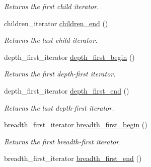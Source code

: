 \begin{DoxyCompactItemize}
\begin{DoxyCompactList}\small\item\em Returns the first child iterator. \end{DoxyCompactList}\item 
\hypertarget{class_d_o_1_1_tree_a4bbe761f0929f34567f339615d616bda}{children\-\_\-iterator \hyperlink{class_d_o_1_1_tree_a4bbe761f0929f34567f339615d616bda}{children\-\_\-end} ()}\label{class_d_o_1_1_tree_a4bbe761f0929f34567f339615d616bda}

\begin{DoxyCompactList}\small\item\em Returns the last child iterator. \end{DoxyCompactList}\item 
\hypertarget{class_d_o_1_1_tree_aacea50afcacf312bf2254b5c6aa515d4}{depth\-\_\-first\-\_\-iterator \hyperlink{class_d_o_1_1_tree_aacea50afcacf312bf2254b5c6aa515d4}{depth\-\_\-first\-\_\-begin} ()}\label{class_d_o_1_1_tree_aacea50afcacf312bf2254b5c6aa515d4}

\begin{DoxyCompactList}\small\item\em Returns the first depth-\/first iterator. \end{DoxyCompactList}\item 
\hypertarget{class_d_o_1_1_tree_ab20dfe0da9bfd5b4e021b4081813555f}{depth\-\_\-first\-\_\-iterator \hyperlink{class_d_o_1_1_tree_ab20dfe0da9bfd5b4e021b4081813555f}{depth\-\_\-first\-\_\-end} ()}\label{class_d_o_1_1_tree_ab20dfe0da9bfd5b4e021b4081813555f}

\begin{DoxyCompactList}\small\item\em Returns the last depth-\/first iterator. \end{DoxyCompactList}\item 
\hypertarget{class_d_o_1_1_tree_aeff3d8457fe71b935b10ce476917928b}{breadth\-\_\-first\-\_\-iterator \hyperlink{class_d_o_1_1_tree_aeff3d8457fe71b935b10ce476917928b}{breadth\-\_\-first\-\_\-begin} ()}\label{class_d_o_1_1_tree_aeff3d8457fe71b935b10ce476917928b}

\begin{DoxyCompactList}\small\item\em Returns the first breadth-\/first iterator. \end{DoxyCompactList}\item 
\hypertarget{class_d_o_1_1_tree_a96a5a047c112cbba0d54d746a6073499}{breadth\-\_\-first\-\_\-iterator \hyperlink{class_d_o_1_1_tree_a96a5a047c112cbba0d54d746a6073499}{breadth\-\_\-first\-\_\-end} ()}\label{class_d_o_1_1_tree_a96a5a047c112cbba0d54d746a6073499}


\end{DoxyCompactItemize}
